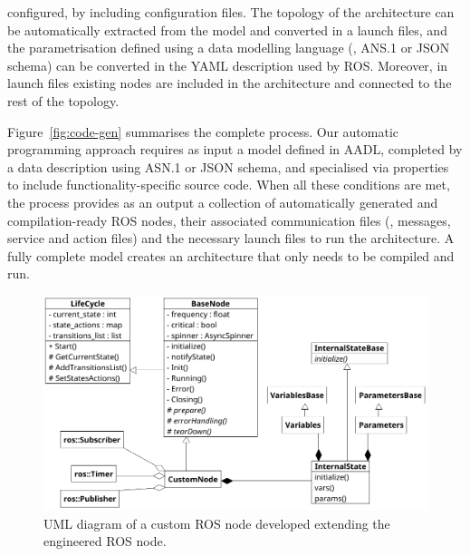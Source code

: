 configured, by including configuration files. The topology of the architecture can be automatically extracted from the model and converted in a launch files, and the parametrisation defined using a data modelling language (\ie, ANS.1 or JSON schema) can be converted in the YAML description used by ROS. Moreover, in launch files existing nodes are included in the architecture and connected to the rest of the topology.

Figure~\ref{fig:code-gen} summarises the complete process. Our automatic programming approach requires as input a model defined in AADL, completed by a data description using ASN.1 or JSON schema, and specialised via properties to include functionality-specific source code. When all these conditions are met, the process provides as an output a collection of automatically generated and compilation-ready ROS nodes, their associated communication files (\ie, messages, service and action files) and the necessary launch files to run the architecture. A fully complete model creates an architecture that only needs to be compiled and run.

\begin{figure}[t]
    \centering
    \includegraphics[width=\textwidth]{gfx/class}
    \caption{UML diagram of a custom ROS node developed extending the engineered ROS node.}\label{fig:node-class}
\end{figure}

